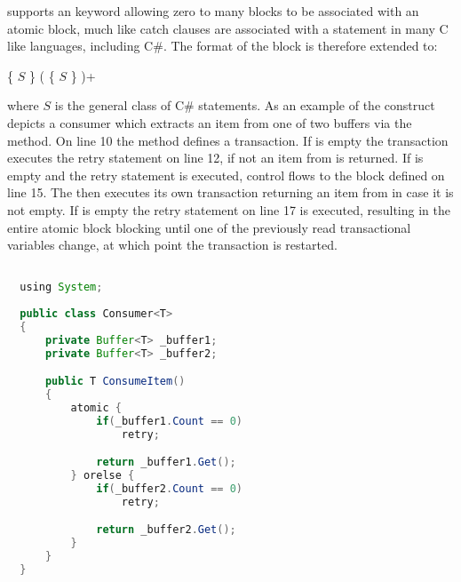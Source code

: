 \stmnamesp supports an  keyword allowing zero to many  blocks to be associated with an atomic block, much like catch clauses are associated with a  statement in many C like languages, including C\#\cite[p. 96]{sestoft2011c}. The  format of the  block is therefore extended to:

 \{ $S$ \} (  \{ $S$ \} )+

where $S$ is the general class of C\# statements. As an example of the  construct   depicts a consumer which extracts an item from one of two buffers via the  method. On line 10 the  method defines a transaction. If  is empty the transaction executes the retry statement on line 12, if not an item from  is returned. If  is empty and the retry statement is executed, control flows to the  block defined on line 15. The  then executes its own transaction returning an item from  in case it is not empty. If  is empty the retry statement on line 17 is executed, resulting in the entire atomic block blocking until one of the previously read transactional variables change, at which point the transaction is restarted.

\begin{lstlisting}[label=lst:stm_atomic_syntax_orelse,
  caption={OrElse Syntax},
  language=Java,  
  showspaces=false,
  showtabs=false,
  breaklines=true,
  showstringspaces=false,
  breakatwhitespace=true,
  commentstyle=\color{greencomments},
  keywordstyle=\color{bluekeywords},
  stringstyle=\color{redstrings},
  morekeywords={atomic, retry, orelse, var, get, set, using}]  % Start your code-block

  using System;
  
  public class Consumer<T>
  {
      private Buffer<T> _buffer1;
      private Buffer<T> _buffer2;

      public T ConsumeItem()
      {
          atomic {
              if(_buffer1.Count == 0)
                  retry;

              return _buffer1.Get();
          } orelse {
              if(_buffer2.Count == 0)
                  retry;

              return _buffer2.Get();
          }
      }
  }
\end{lstlisting}

